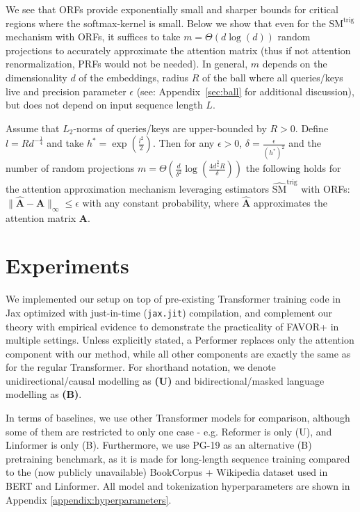 We see that ORFs provide exponentially small and sharper bounds for critical regions where the softmax-kernel is small. Below we show that even for the $\mathrm{SM}^{\mathrm{trig}}$ mechanism with ORFs, it suffices to take $m=\Theta(d\log(d))$ random projections to accurately approximate the attention matrix (thus if not attention renormalization, PRFs would not be needed). In general, $m$ depends on the dimensionality $d$ of the embeddings, radius $R$ of the ball where all queries/keys live and precision parameter $\epsilon$ (see: Appendix~\ref{sec:ball} for additional discussion), but does not depend on input sequence length $L$.

\begin{theorem}
\label{thm:uniform}
Assume that $L_{2}$-norms of queries/keys are upper-bounded by $R>0$. Define $l=Rd^{-\frac{1}{4}}$ and take $h^{*} = \exp(\frac{l^{2}}{2})$.
Then for any $\epsilon>0$, $\delta=\frac{\epsilon}{(h^{*})^{2}}$
and the number of random projections $m=\Theta(\frac{d}{\delta^{2}}\log(\frac{4d^{\frac{3}{4}} R}{\delta}))$ the following holds for the attention approximation mechanism leveraging estimators $\widehat{\mathrm{SM}}^{\mathrm{trig}}$ with ORFs:
$\|\widehat{\mathbf{A}}-\mathbf{A}\|_{\infty} \leq \epsilon$ with any constant probability, where $\widehat{\mathbf{A}}$ approximates the attention matrix $\mathbf{A}$.
\end{theorem}

\section{Experiments}
\label{sec:experiments}
We implemented our setup on top of pre-existing Transformer training code in Jax \citep{jax} optimized with just-in-time (\texttt{jax.jit}) compilation, and complement our theory with empirical evidence to demonstrate the practicality of FAVOR+ in multiple settings. Unless explicitly stated, a Performer replaces only the attention component with our method, while all other components are exactly the same as for the regular Transformer. For shorthand notation, we denote unidirectional/causal modelling as \textbf{(U)} and bidirectional/masked language modelling as \textbf{(B)}. 

In terms of baselines, we use other Transformer models for comparison, although some of them are restricted to only one case - e.g. Reformer \citep{reformer} is only (U), and Linformer \citep{linformer} is only (B). Furthermore, we use PG-19 \citep{compr} as an alternative (B) pretraining benchmark, as it is made for long-length sequence training compared to the (now publicly unavailable) BookCorpus \citep{bookcorpus} + Wikipedia dataset used in BERT \citep{bert} and Linformer. All model and tokenization hyperparameters are shown in Appendix \ref{appendix:hyperparameters}.

